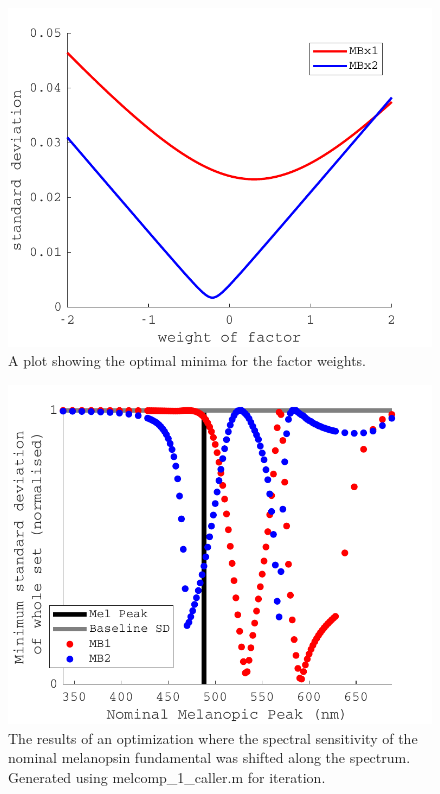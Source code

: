 \begin{figure}[htbp]
    \includegraphics[max width=\textwidth]{figs/comp/melcomp_1/minimiseSD.pdf}
    \caption{A plot showing the optimal minima for the factor weights.}
    \label{fig:minSD}
\end{figure} 

\begin{figure}[ht]
    \includegraphics[max width=\textwidth]{figs/comp/melcomp_1_caller/opt.pdf}
    \caption{The results of an optimization where the spectral sensitivity of the nominal melanopsin fundamental was shifted along the spectrum. Generated using melcomp\_1\_caller.m for iteration.}
    \label{fig:opt}
\end{figure} 

